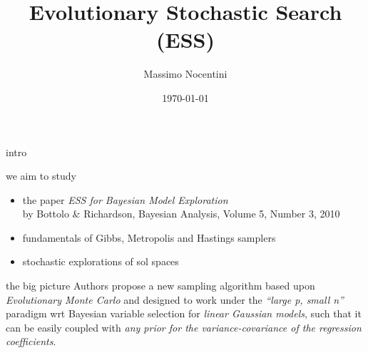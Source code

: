 \documentclass{beamer}
\title{Evolutionary Stochastic Search (ESS)}
\author[Merlini, Nocentini] %
{Massimo Nocentini}
\institute
{
  Dipartimento di Statistica, Informatica, Applicazioni \\
  University of Florence, Italy
}
\date[Short Occasion]{\today}
\begin{document}
\begin{frame}
  \titlepage
\end{frame}

\iffalse
\begin{frame}{Outline}
  \tableofcontents
\end{frame}
\fi





\begin{frame}{intro}

\begin{block}{we aim to study}
\begin{itemize}
    \item the paper \textit{ESS for Bayesian Model
    Exploration}\\{\footnotesize by Bottolo \& Richardson, Bayesian
    Analysis, Volume 5, Number 3, 2010}
    \item fundamentals of Gibbs, Metropolis and Hastings samplers
    \item stochastic explorations of sol spaces
\end{itemize}
\end{block}

\begin{block}{the big picture}
Authors propose a new sampling algorithm based upon \emph{Evolutionary Monte
Carlo} and designed to work under the \emph{``large p, small n''} paradigm wrt
Bayesian variable selection for \emph{linear Gaussian models}, such that it can
be easily coupled with \emph{any prior for the variance-covariance of the
regression coefficients}.
\end{block}

\end{frame}
\end{document}
